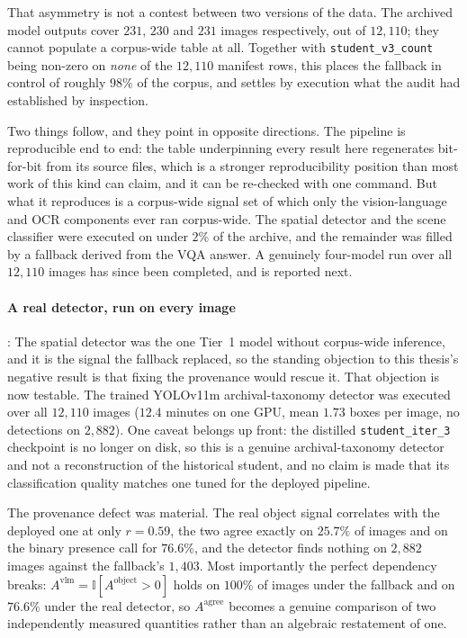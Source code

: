 \documentclass[12pt,a4paper]{report}
\begin{document}
\begin{enumerate}
That asymmetry is not a contest between two versions of the data. The archived model outputs cover $231$, $230$ and $231$ images respectively, out of $12{,}110$; they cannot populate a corpus-wide table at all. Together with \texttt{student\_v3\_count} being non-zero on \emph{none} of the $12{,}110$ manifest rows, this places the fallback in control of roughly $98\%$ of the corpus, and settles by execution what the audit had established by inspection.

Two things follow, and they point in opposite directions. The pipeline is reproducible end to end: the table underpinning every result here regenerates bit-for-bit from its source files, which is a stronger reproducibility position than most work of this kind can claim, and it can be re-checked with one command. But what it reproduces is a corpus-wide signal set of which only the vision-language and OCR components ever ran corpus-wide. The spatial detector and the scene classifier were executed on under $2\%$ of the archive, and the remainder was filled by a fallback derived from the VQA answer. A genuinely four-model run over all $12{,}110$ images has since been completed, and is reported next.

\paragraph{A real detector, run on every image}: The spatial detector was the one Tier~1 model without corpus-wide inference, and it is the signal the fallback replaced, so the standing objection to this thesis's negative result is that fixing the provenance would rescue it. That objection is now testable. The trained YOLOv11m archival-taxonomy detector was executed over all $12{,}110$ images ($12.4$ minutes on one GPU, mean $1.73$ boxes per image, no detections on $2{,}882$). One caveat belongs up front: the distilled \texttt{student\_iter\_3} checkpoint is no longer on disk, so this is a genuine archival-taxonomy detector and not a reconstruction of the historical student, and no claim is made that its classification quality matches one tuned for the deployed pipeline.

The provenance defect was material. The real object signal correlates with the deployed one at only $r=0.59$, the two agree exactly on $25.7\%$ of images and on the binary presence call for $76.6\%$, and the detector finds nothing on $2{,}882$ images against the fallback's $1{,}403$. Most importantly the perfect dependency breaks: $A^{\text{vlm}} = \mathbb{I}[A^{\text{object}}>0]$ holds on $100\%$ of images under the fallback and on $76.6\%$ under the real detector, so $A^{\text{agree}}$ becomes a genuine comparison of two independently measured quantities rather than an algebraic restatement of one.


\end{enumerate}
\end{document}
